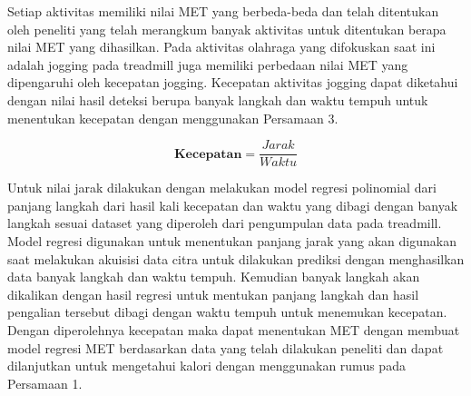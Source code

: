Setiap aktivitas memiliki nilai MET yang berbeda-beda dan telah ditentukan oleh peneliti yang telah merangkum banyak aktivitas untuk ditentukan berapa nilai MET yang dihasilkan. Pada aktivitas olahraga yang difokuskan saat ini adalah jogging pada treadmill juga memiliki perbedaan nilai MET yang dipengaruhi oleh kecepatan jogging. Kecepatan aktivitas jogging dapat diketahui dengan nilai hasil deteksi berupa banyak langkah dan waktu tempuh untuk menentukan kecepatan dengan menggunakan Persamaan 3.

\begin{equation}
  \label{eq:RumusKecepatan}
  \mathbf{Kecepatan} = \frac{Jarak}{Waktu}
\end{equation}

Untuk nilai jarak dilakukan dengan melakukan model regresi polinomial dari panjang langkah dari hasil kali kecepatan dan waktu yang dibagi dengan banyak langkah sesuai dataset yang diperoleh dari pengumpulan data pada treadmill. Model regresi digunakan untuk menentukan panjang jarak yang akan digunakan saat melakukan akuisisi data citra untuk dilakukan prediksi dengan menghasilkan data banyak langkah dan waktu tempuh. Kemudian banyak langkah akan dikalikan dengan hasil regresi untuk mentukan panjang langkah dan hasil pengalian tersebut dibagi dengan waktu tempuh untuk menemukan kecepatan. Dengan diperolehnya kecepatan maka dapat menentukan MET dengan membuat model regresi MET berdasarkan data yang telah dilakukan peneliti dan dapat dilanjutkan untuk mengetahui kalori dengan menggunakan rumus pada Persamaan 1.

